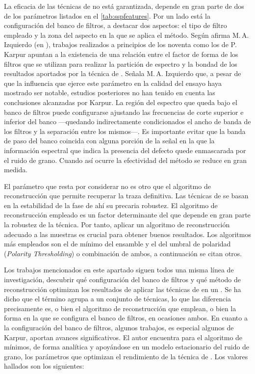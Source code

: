La eficacia de las técnicas de  no está garantizada, depende en
gran parte de dos de los parámetros listados en el \cref{tab:sspfeatures}.
Por un lado está la configuración del banco de filtros, a destacar dos
aspectos: el tipo de filtro empleado y la zona del aspecto en la que se
aplica el método. Según afirma M.\,A. Izquierdo (en \cite{garcia2000mrsr}),
trabajos realizados a principios de los noventa como los de P.\,Karpur
apuntan a la existencia de una relación entre el factor de forma de los
filtros que se utilizan para realizar la partición de espectro y la bondad
de los resultados aportados por la técnica de . Señala M.\,A.
Izquierdo que, a pesar de que la influencia que ejerce este parámetro en la
calidad del ensayo haya mostrado ser notable, estudios posteriores no han
tenido en cuenta las conclusiones alcanzadas por Karpur. La región del
espectro que queda bajo el banco de filtros puede configurarse ajustando
las frecuencias de corte superior e inferior del banco ---quedando
indirectamente condicionados el ancho de banda de los filtros y la
separación entre los mismos---. Es importante evitar que la banda de paso
del banco coincida con alguna porción de la señal en la que la información
espectral que indica la presencia del defecto quede enmascarada por el
ruido de grano. Cuando así ocurre la efectividad del método se reduce en
gran medida.

El parámetro que resta por considerar no es otro que el algoritmo de
reconstrucción que permite recuperar la traza definitiva. Las técnicas de
 se basan en la estabilidad de la fase de ahí su precaria
robustez. El algoritmo de reconstrucción empleado es un factor determinante
del que depende en gran parte la robustez de la técnica. Por tanto, aplicar
un algoritmo de reconstrucción adecuado a las muestras es crucial para
obtener buenos resultados. Los algoritmos más empleados son el de mínimo
del ensamble y el del umbral de polaridad (\emph{Polarity Thresholding}) o
combinación de ambos, a continuación se citan otros.

Los trabajos mencionados en este apartado siguen todos una misma línea de
investigación, descubrir qué configuración del banco de filtros y qué
método de reconstrucción optimizan los resultados de aplicar las técnicas
de  en un . Se ha dicho que el término  agrupa
a un conjunto de técnicas, lo que las diferencia precisamente es, o bien el
algoritmo de reconstrucción que emplean, o bien la forma en la que se
configura el banco de filtros, en ocasiones ambos. En cuanto a la
configuración del banco de filtros, algunos trabajos, es especial algunos
de Karpur, aportan avances significativos. El autor encuentra para el
algoritmo de mínimos, de forma analítica y apoyándose en un modelo
estacionario del ruido de grano, los parámetros que optimizan el
rendimiento de la técnica de . Los valores hallados son los
siguientes:

